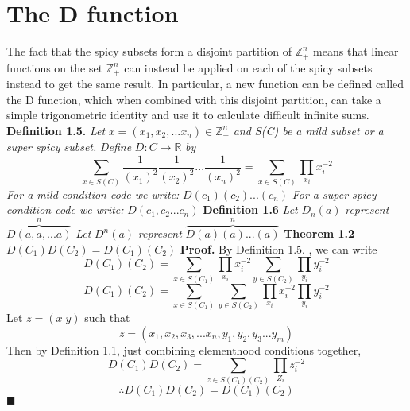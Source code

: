 \documentclass[12pt]{article}
\begin{document}
\section{The D function}
The fact that the spicy subsets form a disjoint partition of \(\mathbb{Z}_+^n\) means that linear functions on the set \(\mathbb{Z}_+^n\) can instead be applied on each of the spicy subsets instead to get the same result.
\newline \newline
In particular, a new function can be defined called the D function, which when combined with this disjoint partition, can take a simple trigonometric identity and use it to calculate difficult infinite sums.
\newline \newline
\textbf{Definition 1.5.} \textit{Let } \(x = (x_1,x_2,...x_n)\in \mathbb{Z}_+^n\)\textit{ and S(C) be a mild subset or a super spicy subset.}
\newline
\textit{Define }\(D:C\rightarrow \mathbb{R}\) \textit{ by }
\[\sum_{x \in S(C)}\frac{1}{(x_1)^2}\frac{1}{(x_2)^2}...\frac{1}{(x_n)^2}=\sum_{x \in S(C)}\prod_{x_i}x_i^{-2}\]
\textit{For a mild condition code we write: }\(D(c_1)(c_2)...(c_n)\)
\newline
\textit{For a super spicy condition code we write: }\(D(c_1,c_2...c_n)\)
\newline \newline
\textbf{Definition 1.6} \newline
\textit{Let} \(D_n(a)\) \textit{represent} \(\overbrace{D(a,a,...a)}^{n}\)
\newline
\textit{Let} \(D^n(a)\) \textit{represent} \(\overbrace{D(a)(a)...(a)}^{n}\)
\newline
\newline
\textbf{Theorem 1.2}\newline
\(D(C_1)D(C_2)=D(C_1)(C_2)\) \newline
\newline
\textbf{Proof.} By Definition 1.5. , we can write
\[D(C_1)(C_2) =\sum_{x\in S(C_1)}\prod_{x_i}x_i^{-2}\sum_{y\in S(C_2)}\prod_{y_i}y_i^{-2}\]
\[D(C_1)(C_2) =\sum_{x\in S(C_1)}\sum_{y\in S(C_2)}\prod_{x_i}x_i^{-2}\prod_{y_i}y_i^{-2}\]
Let \(z = (x | y)\) such that
\[z = (x_1,x_2,x_3,...x_n,y_1,y_2,y_3...y_m)\]
Then by Definition 1.1, just combining elementhood conditions together,
\[D(C_1)D(C_2) =\sum_{z \in S(C_1)(C_2)}\prod_{Z_i}z_i^{-2}\]
\[\therefore D(C_1)D(C_2) = D(C_1)(C_2)\]
\(\blacksquare\)
\newline
\newline
\end{document}
